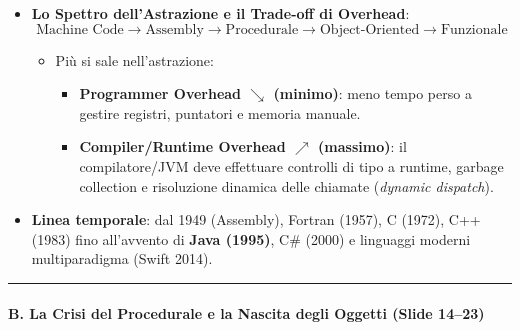 \documentclass[11pt,a4paper]{article}
\providecommand{\tightlist}{\setlength{\itemsep}{0pt}\setlength{\parskip}{0pt}}
\begin{document}
\begin{itemize}
\begin{enumerate}
    \begin{itemize}
    \tightlist
    \item
      Unisce il nucleo imperativo (gli oggetti contengono uno stato
      interno) a tratti dichiarativi (gli oggetti espongono
      comportamenti invocabili senza conoscerne l'algoritmo interno).
    \item
      Basato su \textbf{istanze} che comunicano tramite
      \textbf{passaggio di messaggi}.
    \end{itemize}
  \end{enumerate}
\item
  \textbf{Lo Spettro dell'Astrazione e il Trade-off di Overhead}:
  \[\text{Machine Code} \longrightarrow \text{Assembly} \longrightarrow \text{Procedurale} \longrightarrow \text{Object-Oriented} \longrightarrow \text{Funzionale}\]

  \begin{itemize}
  \tightlist
  \item
    Più si sale nell'astrazione:

    \begin{itemize}
    \tightlist
    \item
      \textbf{Programmer Overhead \(\searrow\) (minimo)}: meno tempo
      perso a gestire registri, puntatori e memoria manuale.
    \item
      \textbf{Compiler/Runtime Overhead \(\nearrow\) (massimo)}: il
      compilatore/JVM deve effettuare controlli di tipo a runtime,
      garbage collection e risoluzione dinamica delle chiamate
      (\emph{dynamic dispatch}).
    \end{itemize}
  \end{itemize}
\item
  \textbf{Linea temporale}: dal 1949 (Assembly), Fortran (1957), C
  (1972), C++ (1983) fino all'avvento di \textbf{Java (1995)}, C\#
  (2000) e linguaggi moderni multiparadigma (Swift 2014).
\end{itemize}

\begin{center}\rule{0.5\linewidth}{0.5pt}\end{center}

\paragraph{B. La Crisi del Procedurale e la Nascita degli Oggetti (Slide
14--23)}\label{b.-la-crisi-del-procedurale-e-la-nascita-degli-oggetti-slide-1423}
\end{document}
